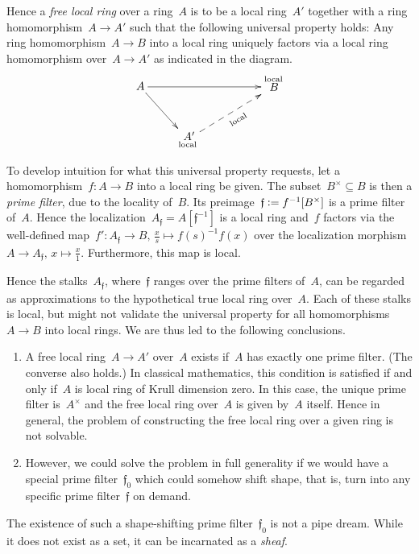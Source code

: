 \documentclass{ws-rv9x6}
\newcommand{\fff}{\mathfrak{f}}
\newcommand{\defeq}{\vcentcolon=}
\renewcommand{\_}{\mathpunct{.}}
\newcommand{\?}{\,{:}\,}
\begin{document}
Hence a \emph{free local ring} over a ring~$A$ is to be a local ring~$A'$
together with a ring homomorphism~$A \to A'$ such that the following universal
property holds: Any ring homomorphism~$A \to B$ into a local ring uniquely
factors via a local ring homomorphism over~$A \to A'$ as indicated in the diagram.
\[ \xymatrix{
  A \ar[rd] \ar[rrr] &&& {\substack{\text{local}\\\text{\normalsize$\!\!\!B$}\\\phantom{\text{local}}}} \\
  & {\substack{\text{\normalsize$\!\!A'$}\\\text{local}}} \ar@{-->}_[@!31]{\text{local}}[rru]
} \]

To develop intuition for what this universal property requests, let a
homomorphism~$f : A \to B$ into a local ring be given. The subset~$B^\times
\subseteq B$ is then a \emph{prime filter}, due to the locality of~$B$. Its
preimage~$\fff \defeq f^{-1}[B^\times]$ is a prime filter of~$A$. Hence the
localization~$A_\fff = A[\fff^{-1}]$ is a local ring and~$f$ factors via the
well-defined map~$f' : A_\fff \to B,\,\frac{x}{s} \mapsto f(s)^{-1}f(x)$ over
the localization morphism~$A \to A_\fff,\,x \mapsto \frac{x}{1}$. Furthermore,
this map is local.

Hence the stalks~$A_\fff$, where~$\fff$ ranges over the prime filters of~$A$,
can be regarded as approximations to the hypothetical true local ring over~$A$.
Each of these stalks is local, but might not validate the universal property
for all homomorphisms~$A \to B$ into local rings. We are thus led to the
following conclusions.

\begin{enumerate}
\item A free local ring~$A \to A'$ over~$A$ exists if~$A$ has exactly one prime
filter. (The converse also holds.) In classical mathematics, this condition is
satisfied if and only if~$A$ is local ring of Krull dimension zero. In this
case, the unique prime filter is~$A^\times$ and the free local ring over~$A$ is given
by~$A$ itself. Hence in general, the problem of constructing the free local
ring over a given ring is not solvable.
\item However, we could solve the problem in full generality if we would have a
special prime filter~$\fff_0$ which could somehow shift shape, that is, turn into any
specific prime filter~$\fff$ on demand.
\end{enumerate}

The existence of such a shape-shifting prime filter~$\fff_0$ is not a pipe dream.
While it does not exist as a set, it can be incarnated as a \emph{sheaf}.
\end{document}
